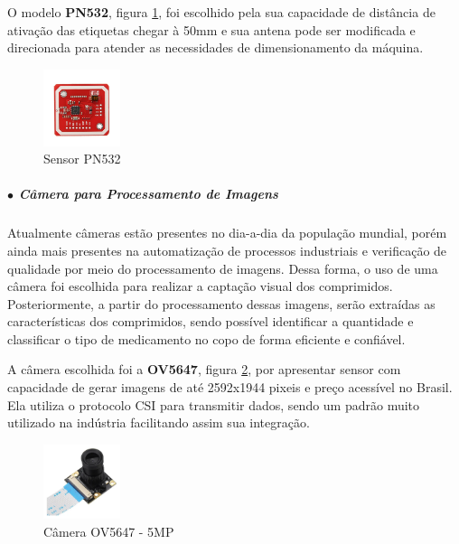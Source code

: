     O modelo \textbf{PN532}, figura \ref{fig:sensor_RFID}, foi escolhido pela sua capacidade de distância de ativação das etiquetas chegar à 50mm e sua antena pode ser modificada e direcionada para atender as necessidades de dimensionamento da máquina.
    
    \begin{figure}[H]
        \centering
        \includegraphics[width=0.2\textwidth]{figuras/sensor_RFID.jpg}
        \caption{Sensor PN532}
        \label{fig:sensor_RFID}
    \end{figure}
    
    
    \subparagraph*{$\bullet$ Câmera para Processamento de Imagens} \hfill
    
    Atualmente câmeras estão presentes no dia-a-dia da população mundial, porém ainda mais presentes na automatização de processos industriais e verificação de qualidade por meio do processamento de imagens. Dessa forma, o uso de uma câmera foi escolhida para realizar a captação visual dos comprimidos. Posteriormente, a partir do  processamento dessas imagens, serão extraídas as características dos comprimidos, sendo possível identificar a quantidade e classificar o tipo de medicamento no copo de forma eficiente e confiável.
    
    A câmera escolhida foi a \textbf{OV5647}, figura \ref{fig:camera_process}, por apresentar sensor com capacidade de gerar imagens de até 2592x1944 pixeis e preço acessível no Brasil. Ela utiliza o protocolo CSI para transmitir dados, sendo um padrão muito utilizado na indústria facilitando assim sua integração.
    
    \begin{figure}[H]
        \centering
        \includegraphics[width=0.2\textwidth]{figuras/OV5647.png}
        \caption{Câmera OV5647 - 5MP}
        \label{fig:camera_process}
    \end{figure}
    
